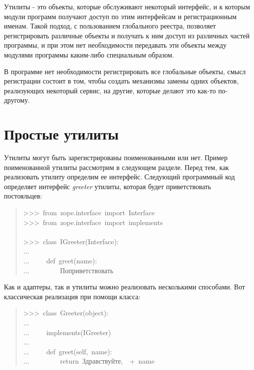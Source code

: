 \documentclass[a4paper,openany,twoside,final]{book}
\providecommand*{\DUroletitlereference}[1]{\textsl{#1}}
\begin{document}
Утилиты - это объекты, которые обслуживают некоторый интерфейс, и к
которым модули программ получают доступ по этим интерфейсам и
регистрационным именам.  Такой подход, с пользованием глобального
реестра, позволяет регистрировать различные объекты и получать к ним
доступ из различных частей программы, и при этом нет необходимости
передавать эти объекты между модулями программы каким-либо специальным
образом.

В программе нет необходимости регистрировать все глобальные объекты,
смысл регистрации состоит в том, чтобы создать механизмы замены одних
объектов, реализующих некоторый сервис, на другие, которые делают это
как-то по-другому.


\section{Простые утилиты%
  \label{id41}%
}

Утилиты могут быть зарегистрированы поименованными или нет.  Пример
поименованной утилиты рассмотрим в следующем разделе.  Перед тем, как
реализовать утилиту определим ее интерфейс.  Следующий программный код
определяет интерфейс \DUroletitlereference{greeter} утилиты, которая будет приветствовать
постояльцев:

\begin{quote}{\ttfamily \raggedright \noindent
>{}>{}>~from~zope.interface~import~Interface\\
>{}>{}>~from~zope.interface~import~implements\\
~\\
>{}>{}>~class~IGreeter(Interface):\\
...\\
...~~~~~def~greet(name):\\
...~~~~~~~~~\textquotedbl{}\textquotedbl{}\textquotedbl{}Поприветствовать\textquotedbl{}\textquotedbl{}\textquotedbl{}
}
\end{quote}

Как и адаптеры, так и утилиты можно реализовать несколькими
способами.  Вот классическая реализация при помощи класса:

\begin{quote}{\ttfamily \raggedright \noindent
>{}>{}>~class~Greeter(object):\\
...\\
...~~~~~implements(IGreeter)\\
...\\
...~~~~~def~greet(self,~name):\\
...~~~~~~~~~return~\textquotedbl{}Здравствуйте,~\textquotedbl{}~+~name
}
\end{quote}
\end{document}
